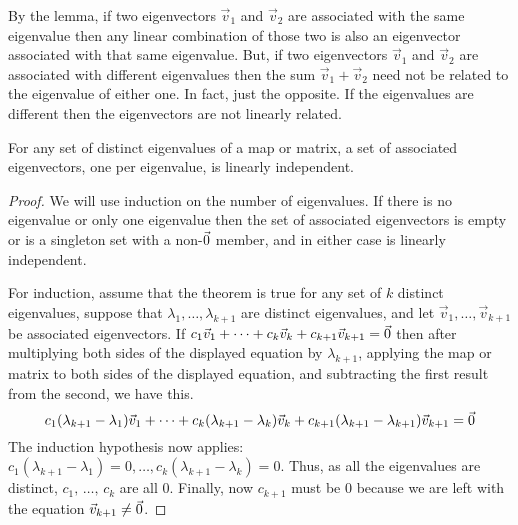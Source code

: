 By the lemma, if two eigenvectors $\vec{v}_1$ and $\vec{v}_2$ are 
associated with the same eigenvalue then any linear combination of those
two is also an eigenvector associated with that same eigenvalue.
But, if two eigenvectors \( \vec{v}_1 \) and \( \vec{v}_2 \) 
are associated with different eigenvalues
then the sum \( \vec{v}_1+\vec{v}_2 \) need not be related 
to the eigenvalue of either one.
In fact, just the opposite.
If the eigenvalues are different then the eigenvectors are not 
linearly related.

\begin{theorem}
\label{th:DistEValueGivesLIEvecs}
For any set of distinct eigenvalues of a map or matrix, a set of associated
eigenvectors, one per eigenvalue, is linearly independent.
\end{theorem}

\begin{proof}
We will use induction on the number of eigenvalues.
If there is no eigenvalue or
only one eigenvalue then the set of associated eigenvectors is
empty or is a singleton set with a non-$\vec{0}$ member, 
and in either case is linearly independent.

For induction, assume that the theorem
is true for any set of \( k \)
distinct eigenvalues, suppose that 
\( \lambda_1,\dots,\lambda_{k+1} \)
are distinct eigenvalues,
and let \( \vec{v}_1,\dots,\vec{v}_{k+1} \)
be associated eigenvectors.
If
\( c_1\vec{v}_1+\dots+c_k\vec{v}_k+c_{k+1}\vec{v}_{k+1}=\vec{0} \)
then after multiplying both sides of the displayed equation by
\( \lambda_{k+1} \), applying the map or matrix to both sides
of the displayed equation,
and subtracting the first result from the second, we have this.
\begin{equation*}
  c_1(\lambda_{k+1}-\lambda_1)\vec{v}_1+\dots
  +c_k(\lambda_{k+1}-\lambda_k)\vec{v}_k
      +c_{k+1}(\lambda_{k+1}-\lambda_{k+1})\vec{v}_{k+1}=\vec{0}
\end{equation*}
The induction hypothesis now applies:
\( c_1(\lambda_{k+1}-\lambda_1)=0,\dots,c_k(\lambda_{k+1}-\lambda_k)=0 \).
Thus, as all the eigenvalues are distinct,
\( c_1,\,\dots,\,c_k \) are all \( 0 \).
Finally, now \( c_{k+1} \) must be \( 0 \) because
we are left with the equation \( \vec{v}_{k+1}\neq\vec{0} \).
\end{proof}

